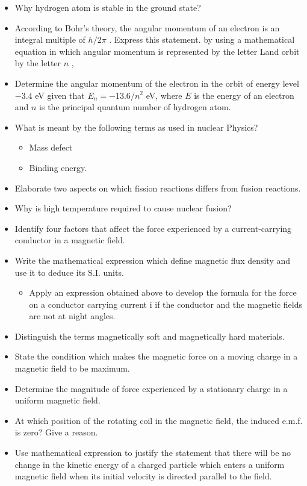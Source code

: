 \documentclass{article}
\begin{document}
\begin{itemize}
\item Why hydrogen atom is stable in the ground state? 
\item According to Bohr’s theory, the angular momentum of an electron is an integral multiple of $ h/2\pi$ .  Express this statement. by using a mathematical equation in which angular momentum is represented by the letter Land orbit by the letter $ n$ , 
\item Determine the angular momentum of the electron in the orbit of energy level $ -3.4$ eV given that $ E_{n}=-13.6/n^{2}$ eV, where $ E$ is the energy of an electron and $ n$ is the principal quantum number of hydrogen atom. 
\item What is meant by the following terms as used in nuclear Physics?
 \begin{itemize}
\item Mass defect 
\item Binding energy. 
\end{itemize}
\item Elaborate two aspects on which fission reactions differs from fusion reactions.
\item Why is high temperature required to cause nuclear fusion? 
\item Identify four factors that affect the force experienced by a current-carrying conductor in a magnetic field. 
\item Write the mathematical expression which define magnetic flux density and use it to deduce its S.I. units. 
 \begin{itemize}
\item Apply an expression obtained above to develop the formula for the force on a conductor carrying current i if the conductor and the magnetic fields are not at night angles.
\end{itemize}
\item Distinguish the terms magnetically soft and magnetically hard materials.
\item State the condition which makes the magnetic force on a moving charge in a magnetic field to be maximum. 
\item Determine the magnitude of force experienced by a stationary charge in a uniform magnetic field. 
\item At which position of the rotating coil in the magnetic field, the induced e.m.f. is zero? Give a reason. 
\item Use mathematical expression to justify the statement that there will be no change in the kinetic energy of a charged particle which enters a uniform magnetic field when its initial velocity is directed parallel to the field.

\end{itemize}
\end{document}
